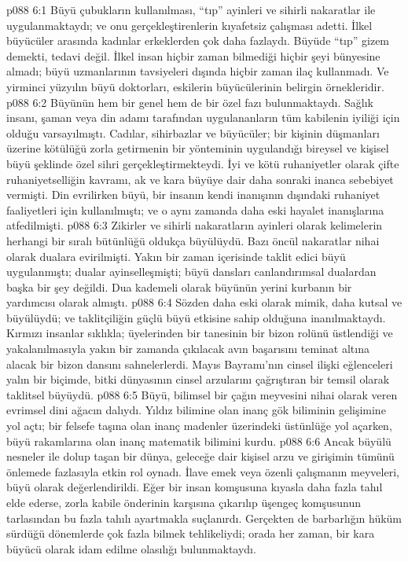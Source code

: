 \vs p088 6:1 Büyü çubukların kullanılması, “tıp” ayinleri ve sihirli nakaratlar ile uygulanmaktaydı; ve onu gerçekleştirenlerin kıyafetsiz çalışması adetti. İlkel büyücüler arasında kadınlar erkeklerden çok daha fazlaydı. Büyüde “tıp” gizem demekti, tedavi değil. İlkel insan hiçbir zaman bilmediği hiçbir şeyi bünyesine almadı; büyü uzmanlarının tavsiyeleri dışında hiçbir zaman ilaç kullanmadı. Ve yirminci yüzyılın büyü doktorları, eskilerin büyücülerinin belirgin örnekleridir.
\vs p088 6:2 Büyünün hem bir genel hem de bir özel fazı bulunmaktaydı. Sağlık insanı, şaman veya din adamı tarafından uygulananların tüm kabilenin iyiliği için olduğu varsayılmıştı. Cadılar, sihirbazlar ve büyücüler; bir kişinin düşmanları üzerine kötülüğü zorla getirmenin bir yönteminin uygulandığı bireysel ve kişisel büyü şeklinde özel sihri gerçekleştirmekteydi. İyi ve kötü ruhaniyetler olarak çifte ruhaniyetselliğin kavramı, ak ve kara büyüye dair daha sonraki inanca sebebiyet vermişti. Din evrilirken büyü, bir insanın kendi inanışının dışındaki ruhaniyet faaliyetleri için kullanılmıştı; ve o aynı zamanda daha eski hayalet inanışlarına atfedilmişti.
\vs p088 6:3 Zikirler ve sihirli nakaratların ayinleri olarak kelimelerin herhangi bir sıralı bütünlüğü oldukça büyülüydü. Bazı öncül nakaratlar nihai olarak dualara evirilmişti. Yakın bir zaman içerisinde taklit edici büyü uygulanmıştı; dualar ayinselleşmişti; büyü dansları canlandırımsal dualardan başka bir şey değildi. Dua kademeli olarak büyünün yerini kurbanın bir yardımcısı olarak almıştı.
\vs p088 6:4 Sözden daha eski olarak mimik, daha kutsal ve büyülüydü; ve taklitçiliğin güçlü büyü etkisine sahip olduğuna inanılmaktaydı. Kırmızı insanlar sıklıkla; üyelerinden bir tanesinin bir bizon rolünü üstlendiği ve yakalanılmasıyla yakın bir zamanda çıkılacak avın başarısını teminat altına alacak bir bizon dansını sahnelerlerdi. Mayıs Bayramı’nın cinsel ilişki eğlenceleri yalın bir biçimde, bitki dünyasının cinsel arzularını çağrıştıran bir temsil olarak taklitsel büyüydü.
\vs p088 6:5 Büyü, bilimsel bir çağın meyvesini nihai olarak veren evrimsel dini ağacın dalıydı. Yıldız bilimine olan inanç gök biliminin gelişimine yol açtı; bir felsefe taşına olan inanç madenler üzerindeki üstünlüğe yol açarken, büyü rakamlarına olan inanç matematik bilimini kurdu.
\vs p088 6:6 Ancak büyülü nesneler ile dolup taşan bir dünya, geleceğe dair kişisel arzu ve girişimin tümünü önlemede fazlasıyla etkin rol oynadı. İlave emek veya özenli çalışmanın meyveleri, büyü olarak değerlendirildi. Eğer bir insan komşusuna kıyasla daha fazla tahıl elde ederse, zorla kabile önderinin karşısına çıkarılıp üşengeç komşusunun tarlasından bu fazla tahılı ayartmakla suçlanırdı. Gerçekten de barbarlığın hüküm sürdüğü dönemlerde çok fazla bilmek tehlikeliydi; orada her zaman, bir kara büyücü olarak idam edilme olasılığı bulunmaktaydı.
